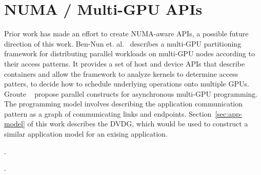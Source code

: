 \section{NUMA / Multi-GPU APIs}

Prior work has made an effort to create NUMA-aware APIs, a possible future direction of this work.
Ben-Nun et. al.~\cite{ben2015memory} describes a multi-GPU partitioning framework for distributing parallel workloads on multi-GPU nodes according to their access patterns.
It provides a set of host and device APIs that describe containers and allow the framework to analyze kernels to determine access patters, to decide how to schedule underlying operations onto multiple GPUs.
Groute ~\cite{ben2017groute} propose parallel constructs for asynchronous multi-GPU programming.
The programming model involves describing the application communication pattern as a graph of communicating links and endpoints.
Section~\ref{sec:app-model} of this work describes the DVDG, which would be used to construct a similar application model for an exising application.

.

.

